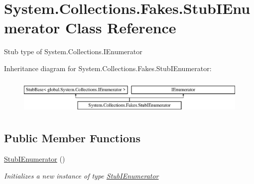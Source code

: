 \hypertarget{class_system_1_1_collections_1_1_fakes_1_1_stub_i_enumerator}{\section{System.\-Collections.\-Fakes.\-Stub\-I\-Enumerator Class Reference}
\label{class_system_1_1_collections_1_1_fakes_1_1_stub_i_enumerator}
}


Stub type of System.\-Collections.\-I\-Enumerator 


Inheritance diagram for System.\-Collections.\-Fakes.\-Stub\-I\-Enumerator\-:\begin{figure}[H]
\begin{center}
\leavevmode
\includegraphics[height=1.789137cm]{class_system_1_1_collections_1_1_fakes_1_1_stub_i_enumerator}
\end{center}
\end{figure}
\subsection*{Public Member Functions}
\begin{DoxyCompactItemize}
\item 
\hyperlink{class_system_1_1_collections_1_1_fakes_1_1_stub_i_enumerator_a80f69643d2b3b21100770aaa906ba8e2}{Stub\-I\-Enumerator} ()
\begin{DoxyCompactList}\small\item\em Initializes a new instance of type \hyperlink{class_system_1_1_collections_1_1_fakes_1_1_stub_i_enumerator}{Stub\-I\-Enumerator}\end{DoxyCompactList}\end{DoxyCompactItemize}
